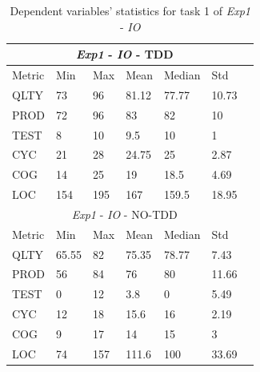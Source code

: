 \begin{table}[H]
    \begin{center} 
        \begin{tabular}{|p{1.8cm}||p{1.6cm}|p{1.6cm}|p{1.6cm}|p{1.6cm}|p{1.6cm}|p{1.6cm}|}
            \hline
                \multicolumn{6}{|c|}{\textit{Exp1} - \textit{IO} - TDD} \\
            \hline
                Metric & Min & Max & Mean & Median & Std \\
            \hline
                QLTY & 73 & 96 & 81.12 & 77.77 & 10.73 \\
                PROD & 72 & 96 & 83 & 82 & 10 \\
                TEST & 8 & 10 & 9.5 & 10 & 1 \\
                CYC & 21 & 28 & 24.75 & 25 & 2.87 \\
                COG & 14 & 25 & 19 & 18.5 & 4.69 \\
                LOC & 154 & 195 & 167 & 159.5 & 18.95 \\
            \hline\hline
                \multicolumn{6}{|c|}{\textit{Exp1} - \textit{IO} - NO-TDD} \\
            \hline
                Metric & Min & Max & Mean & Median & Std\\
            \hline
                QLTY & 65.55 & 82 & 75.35 & 78.77 & 7.43 \\
                PROD & 56 & 84 & 76 & 80 & 11.66 \\
                TEST & 0 & 12 & 3.8 & 0 & 5.49 \\
                CYC & 12 & 18 & 15.6 & 16 & 2.19 \\
                COG & 9 & 17 & 14 & 15 & 3 \\
                LOC & 74 & 157 & 111.6 & 100 & 33.69 \\
            \hline
        \end{tabular}
        \caption{\label{tab_dv_t1}Dependent variables' statistics for task 1 of \textit{Exp1} - \textit{IO}}
    \end{center}
\end{table}

